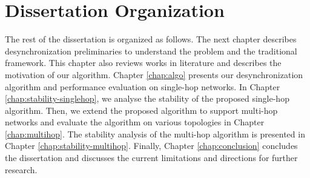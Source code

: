 \section{Dissertation Organization}
\label{sec:intro_organization}
The rest of the dissertation is organized as follows.
The next chapter describes desynchronization preliminaries to understand the problem and the traditional framework.
This chapter also reviews works in literature and describes the motivation of our algorithm.
Chapter \ref{chap:algo} presents our desynchronization algorithm and performance evaluation on single-hop networks. 
In Chapter \ref{chap:stability-singlehop}, we analyse the stability of the proposed single-hop algorithm.
Then, we extend the proposed algorithm to support multi-hop networks and evaluate the algorithm on various topologies in Chapter \ref{chap:multihop}. The stability analysis of the multi-hop algorithm is presented in Chapter \ref{chap:stability-multihop}.
Finally, Chapter \ref{chap:conclusion} concludes the dissertation and discusses the current limitations and directions for further research.
